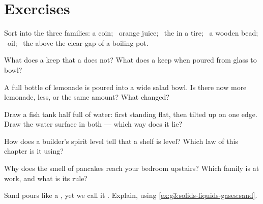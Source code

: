 \section{Exercises}

\begin{exercise}[$\star$]\label{exo:g3:solids-liquids-gases:1}
Sort into the three families: a coin; \ orange juice; \ the  in a
tire; \ a wooden bead; \ oil; \ the  above the clear gap of
a boiling pot.
\end{exercise}

\begin{exercise}[$\star$]\label{exo:g3:solids-liquids-gases:2}
What does a  keep that a  does not? What does a 
keep when poured from glass to bowl?
\end{exercise}

\begin{exercise}[$\star$]\label{exo:g3:solids-liquids-gases:3}
A full bottle of lemonade is poured into a wide salad bowl. Is there
now more lemonade, less, or the same amount? What changed?
\end{exercise}

\begin{exercise}[$\star$]\label{exo:g3:solids-liquids-gases:4}
Draw a fish tank half full of water: first standing flat, then
tilted up on one edge. Draw the water surface in both --- which way
does it lie?
\end{exercise}

\begin{exercise}[$\star$]\label{exo:g3:solids-liquids-gases:5}
How does a builder's spirit level tell that a shelf is level? Which
law of this chapter is it using?
\end{exercise}

\begin{exercise}[$\star$]\label{exo:g3:solids-liquids-gases:6}
Why does the smell of pancakes reach your bedroom upstairs? Which
family is at work, and what is its rule?
\end{exercise}

\begin{exercise}[$\star$]\label{exo:g3:solids-liquids-gases:7}
Sand pours like a , yet we call it . Explain, using
\cref{ex:g3:solids-liquids-gases:sand}.
\end{exercise}

